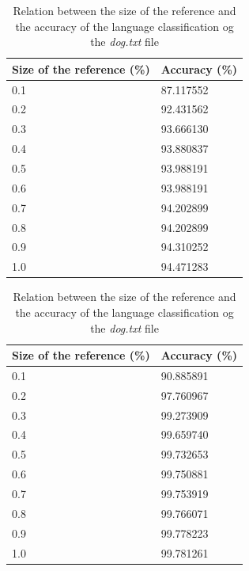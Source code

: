 \documentclass{article}
\begin{document}
\begin{table}
    \centering
    \begin{tabular}{|l|l|}
    \hline
        Size of the reference (\%) & Accuracy (\%) \\ \hline
        0.1 & 87.117552 \\ \hline
        0.2 & 92.431562 \\ \hline
        0.3 & 93.666130 \\ \hline
        0.4 & 93.880837 \\ \hline
        0.5 & 93.988191 \\ \hline
        0.6 & 93.988191 \\ \hline
        0.7 & 94.202899 \\ \hline
        0.8 & 94.202899 \\ \hline
        0.9 & 94.310252 \\ \hline
        1.0 & 94.471283 \\ \hline
    \end{tabular}
    \caption{Relation between the size of the reference and the accuracy of the language classification og the \textit{dog.txt} file}
    \label{tab:rel_size_ref_acc_dog}
\end{table}


\begin{table}
    \centering
    \begin{tabular}{|l|l|}
    \hline
        Size of the reference (\%) & Accuracy (\%) \\ \hline
        0.1 & 90.885891 \\ \hline
        0.2 & 97.760967 \\ \hline
        0.3 & 99.273909 \\ \hline
        0.4 & 99.659740 \\ \hline
        0.5 & 99.732653 \\ \hline
        0.6 & 99.750881 \\ \hline
        0.7 & 99.753919 \\ \hline
        0.8 & 99.766071 \\ \hline
        0.9 & 99.778223 \\ \hline
        1.0 & 99.781261 \\ \hline
    \end{tabular}
    \caption{Relation between the size of the reference and the accuracy of the language classification og the \textit{dog.txt} file}
    \label{tab:rel_size_ref_acc_all}
\end{table}
\end{document}
